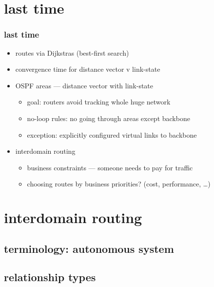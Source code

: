 \date{}
\title{}
\date{}

\begin{frame}
    \titlepage
\end{frame}


\section{last time}
\begin{frame}
\frametitle{last time}
\begin{itemize}
    \item routes via Dijkstras (best-first search)
    \item convergence time for distance vector v link-state
    \item OSPF areas --- distance vector with link-state
        \begin{itemize}
        \item goal: routers avoid tracking whole huge network
        \item no-loop rules: no going through areas except backbone
        \item exception: explicitly configured virtual links to backbone
        \end{itemize}
    \item interdomain routing
        \begin{itemize}
        \item business constraints --- someone needs to pay for traffic
        \item choosing routes by business priorities? (cost, performance, \ldots)
        \end{itemize}
\end{itemize}
\end{frame}

\section{interdomain routing}


\subsection{terminology: autonomous system}


\subsection{relationship types}


